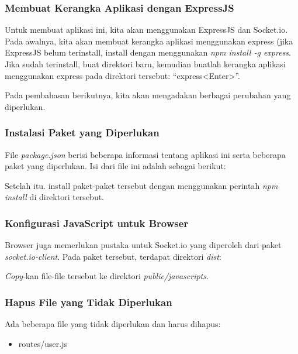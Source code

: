 \subsubsection{Membuat Kerangka Aplikasi dengan ExpressJS}

Untuk membuat aplikasi ini, kita akan menggunakan ExpressJS dan Socket.io. Pada awalnya, kita akan membuat kerangka aplikasi menggunakan express (jika ExpressJS belum terinstall, install dengan menggunakan \textit{npm install -g express}. Jika sudah terinstall, buat direktori baru, kemudian buatlah kerangka aplikasi menggunakan express pada direktori tersebut: ``express<Enter>''.

Pada pembahasan berikutnya, kita akan mengadakan berbagai perubahan yang diperlukan.

\subsubsection{Instalasi Paket yang Diperlukan}

File \textit{package.json} berisi beberapa informasi tentang aplikasi ini serta beberapa paket yang diperlukan. Isi dari file ini adalah sebagai berikut:

\lstset{language=JavaScript,caption=package.json}


Setelah itu. install paket-paket tersebut dengan menggunakan perintah \textit{npm install} di direktori tersebut. 

\subsubsection{Konfigurasi JavaScript untuk Browser}

Browser juga memerlukan pustaka untuk Socket.io yang diperoleh dari paket \textit{socket.io-client}. Pada paket tersebut, terdapat direktori \textit{dist}:

\lstset{language=Bash,caption=Isi direktori dist di socket.io-client}


\textit{Copy}-kan file-file tersebut ke direktori \textit{public/javascripts}.

\subsubsection{Hapus File yang Tidak Diperlukan}

Ada beberapa file yang tidak diperlukan dan harus dihapus:
\begin{itemize}
	\item routes/user.js
\end{itemize}

